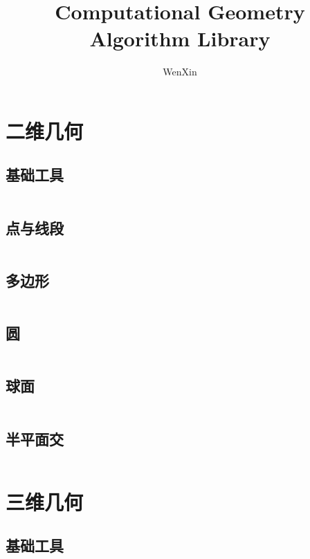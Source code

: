 \documentclass[a4paper,11pt]{article}
\title{Computational Geometry Algorithm Library}
\author{WenXin}
\begin{document}
 
\maketitle %
\newpage %
\tableofcontents %
\newpage
\section{二维几何}
\subsection{基础工具}
\inputminted[frame=lines,linenos,breaklines]{c++}{2D/Fundamental.cpp}

\subsection{点与线段}
\inputminted[frame=lines,linenos,breaklines]{c++}{2D/PointAndSegment.cpp}

\subsection{多边形}
\inputminted[frame=lines,linenos,breaklines]{c++}{2D/Polygon.cpp}

\subsection{圆}
\inputminted[frame=lines,linenos,breaklines]{c++}{2D/Circle.cpp}

\subsection{球面}
\inputminted[frame=lines,linenos,breaklines]{c++}{2D/Sphere.cpp}

\subsection{半平面交}
\inputminted[frame=lines,linenos,breaklines]{c++}{2D/HalfPlaneIntersection.cpp}

\newpage
\section{三维几何}
\subsection{基础工具}
\inputminted[frame=lines,linenos,breaklines]{c++}{3D/Fundamental.cpp}
\end{document}
